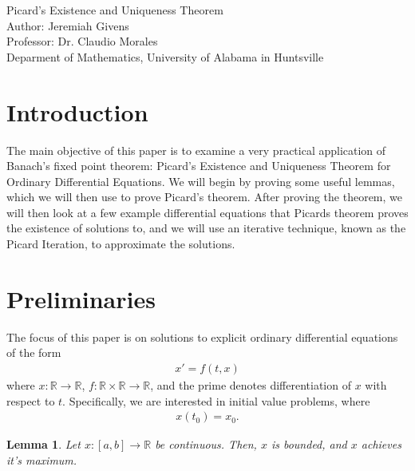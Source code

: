 \documentclass[10pt,a4paper]{article}
\author{Jeremiah Givens}
\theoremstyle{theorem}
\newtheorem{lemma}{Lemma}
\theoremstyle{definition}
\begin{document}
\begin{titlepage}
\vspace*{\fill}
\begin{center}
{\Huge Picard's Existence and Uniqueness Theorem}\\
Author: Jeremiah Givens\\
Professor: Dr. Claudio Morales\\
Deparment of Mathematics, University of Alabama in Huntsville
\end{center}
\vspace*{\fill}
\end{titlepage}

\section{Introduction}
The main objective of this paper is to examine a very practical application of Banach's fixed point theorem: Picard's Existence and Uniqueness Theorem for Ordinary Differential Equations. We will begin by proving some useful lemmas, which we will then use to prove Picard's theorem. After proving the theorem, we will then look at a few example differential equations that Picards theorem proves the existence of solutions to, and we will use an iterative technique, known as the Picard Iteration, to approximate the solutions.

\section{Preliminaries}
The focus of this paper is on solutions to explicit ordinary differential equations of the form
\begin{align*}
x' = f(t, x)
\end{align*}
where $x: \mathbb{R} \to \mathbb{R}$, $f: \mathbb{R} \times \mathbb{R} \to \mathbb{R}$, and the prime denotes differentiation of $x$ with respect to $t$.  Specifically, we are interested in initial value problems, where
\begin{align*}
x(t_0) = x_0.
\end{align*}

\begin{lemma}
Let $x: [a, b] \to \mathbb{R}$ be continuous. Then, $x$ is bounded, and $x$ achieves it's maximum.
\end{lemma}
\end{document}
